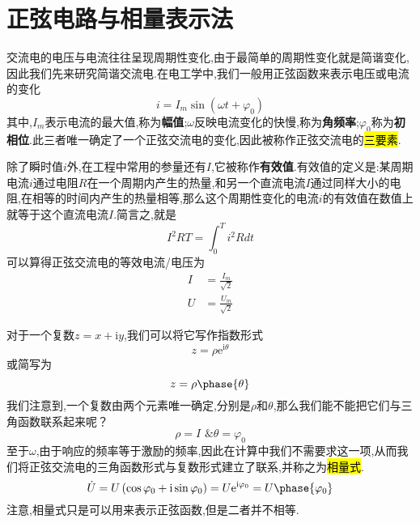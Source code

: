 \section{\K 正弦电路与相量表示法}
\Par 交流电的电压与电流往往呈现周期性变化,由于最简单的周期性变化就是简谐变化,因此我们先来研究简谐交流电.在电工学中,我们一般用正弦函数来表示电压或电流的变化
\begin{equation}
    i=I_m\sin \left( \omega t+\varphi _0 \right) 
\end{equation}
其中,$I_m$表示电流的最大值,称为\textbf{幅值};$\omega $反映电流变化的快慢,称为\textbf{角频率};$\varphi _0$称为\textbf{初相位}.此三者唯一确定了一个正弦交流电的变化,因此被称作正弦交流电的\hl{三要素}.

\Par 除了瞬时值$i$外,在工程中常用的参量还有$I$,它被称作\textbf{有效值}.有效值的定义是:某周期电流$i$通过电阻$R$在一个周期内产生的热量,和另一个直流电流$I$通过同样大小的电阻,在相等的时间内产生的热量相等,那么这个周期性变化的电流$i$的有效值在数值上就等于这个直流电流$I$.简言之,就是
\begin{equation}
    I^2RT=\int_0^T{i^2Rdt}
\end{equation}
可以算得正弦交流电的等效电流/电压为
\begin{align}
	I&=\frac{I_m}{\sqrt{2}}\\
	U&=\frac{U_m}{\sqrt{2}}
\end{align}

\Par 对于一个复数$z=x+\mathrm{i}y$,我们可以将它写作指数形式
\begin{equation}
    z=\rho \mathrm{e}^{\mathrm{i}\theta}
\end{equation}
或简写为
\begin{equation}
    z=\rho \phase{\theta } 
\end{equation}
我们注意到,一个复数由两个元素唯一确定,分别是$\rho $和$\theta $,那么我们能不能把它们与三角函数联系起来呢？
\begin{equation*}
    \rho =I\,\, \&  \theta =\varphi _0
\end{equation*}
至于$\omega $,由于响应的频率等于激励的频率,因此在计算中我们不需要求这一项,从而我们将正弦交流电的三角函数形式与复数形式建立了联系,并称之为\hl{相量式}.
\begin{equation}
    \dot{U}=U\left( \cos \varphi _0+\mathrm{i}\sin \varphi _0 \right) =U\mathrm{e}^{\mathrm{i}\varphi _0}=U \phase{\varphi _0}
\end{equation}
注意,相量式只是可以用来表示正弦函数,但是二者并不相等.